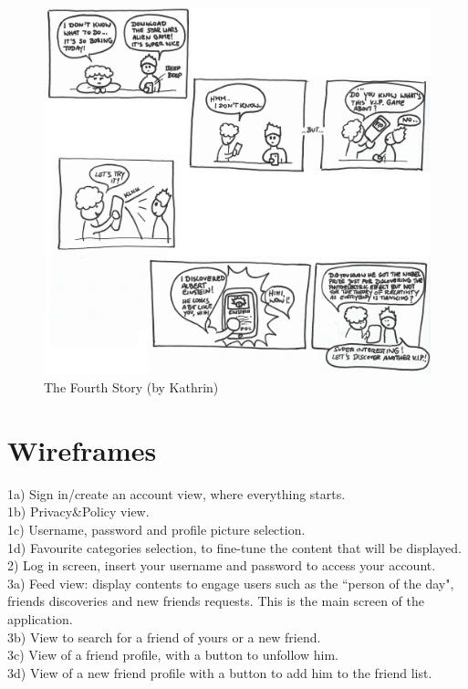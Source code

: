 \documentclass[12pt]{scrartcl}
\begin{document}
	\begin{figure}[H]
        		\centering
       		\includegraphics[width=\textwidth]{../images/story4.jpg}
       		\caption{The Fourth Story (by Kathrin)}
        		\label{story4}
	\end{figure}
	

\section{Wireframes}


	1a) Sign in/create an account view, where everything starts.\\
	1b) Privacy\&Policy view.\\
	1c) Username, password and profile picture selection.\\
	1d) Favourite categories selection, to fine-tune the content that will be displayed.\\

	2) Log in screen, insert your username and password to access your account.\\

	3a) Feed view: display contents to engage users such as the ``person of the day", friends discoveries and new friends requests. This is the main screen of the application.\\
	3b) View to search for a friend of yours or a new friend.\\
	3c) View of a friend profile, with a button to unfollow him.\\
	3d) View of a new friend profile with a button to add him to the friend list.\\
\end{document}
